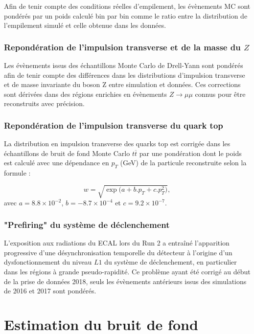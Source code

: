 Afin de tenir compte des conditions réelles d'empilement, les évènements MC sont pondérés par un poids calculé bin par bin comme le ratio entre la distribution de l'empilement simulé et celle obtenue dans les données.

\subsubsection{ Repondération de l'impulsion transverse et de la masse du $Z$}

Les évènements issus des échantillons Monte Carlo de Drell-Yann sont pondérés afin de tenir compte des différences dans les distributions d'impulsion transverse et de masse invariante du boson Z entre simulation et données. Ces corrections sont dérivées dans des régions enrichies en évènements $Z\rightarrow\mu\mu$ connus pour être reconstruits avec précision.

\subsubsection{ Repondération de l'impulsion transverse du quark top}

La distribution en impulsion transverse des quarks top est corrigée dans les échantillons de bruit de fond Monte Carlo $t\overline{t}$ par une pondération dont le poids est calculé avec une dépendance en $p_T$ (GeV) de la particule reconstruite selon la formule :

$$w=\sqrt{\exp\bigl(a+b.p_T+c.p_T^2\bigr)},$$
avec $a=8.8\times 10^{-2}$, $b=-8.7\times 10^{-4}$ et $c=9.2\times 10^{-7}$.

\subsubsection{ "Prefiring" du système de déclenchement}

L'exposition aux radiations du ECAL lors du Run 2 a entraîné l'apparition progressive d'une désynchronisation temporelle du détecteur à l'origine d'un dysfonctionnement du niveau $L1$ du système de déclenchement, en particulier dans les régions à grande pseudo-rapidité. Ce problème ayant été corrigé au début de la prise de données 2018, seuls les évènements antérieurs issus des simulations de 2016 et 2017 sont pondérés.

\section{Estimation du bruit de fond}
\label{fakefactors}

